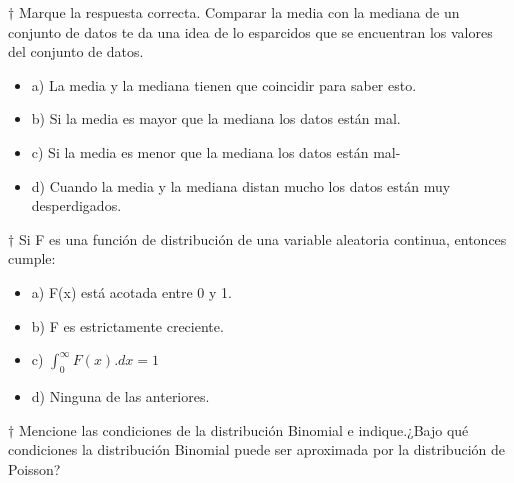 \documentclass[10pt,a4paper]{article}
\begin{document}
$\dagger$  Marque la respuesta correcta. Comparar la media con la mediana de un conjunto de datos te da una idea de lo esparcidos que se encuentran los valores del conjunto de datos. 
\begin{itemize}
	\item a) La media y la mediana tienen que coincidir para saber esto. 
	\item b) Si la media es mayor que la mediana los datos están mal.
	\item c) Si la media es menor que la mediana los datos están mal-  
	\item d) Cuando la media y la mediana distan mucho los datos están muy desperdigados.
\end{itemize}
$\dagger$ Si F es una función de distribución de una variable aleatoria continua, entonces cumple:
\begin{itemize}
	\item a) F(x) está acotada entre 0 y 1. 
	\item b) F es estrictamente creciente. 
	\item c) $\int_{0}^{\infty} F(x).dx=1$
	\item d) Ninguna de las anteriores.
\end{itemize}	
$\dagger$ Mencione las condiciones de la distribución Binomial e indique.¿Bajo qué condiciones la distribución Binomial puede ser aproximada por la distribución de Poisson?
\end{document}
